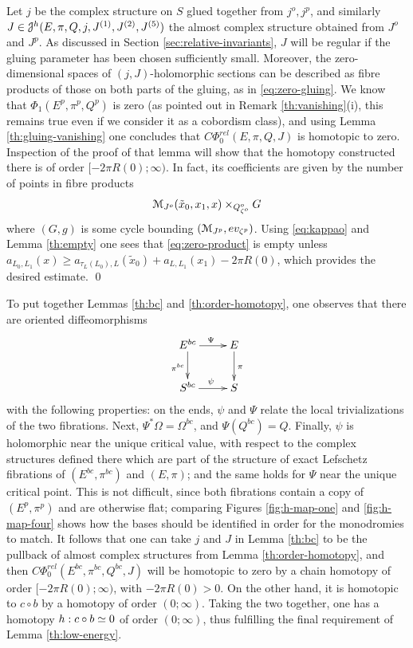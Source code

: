 \documentclass[10pt,letterpaper]{article}
\begin{document}
Let $j$ be the complex structure on $S$ glued together from $j^o,j^p$, and
similarly $J \in \mathcal{J}^h(E,\pi,Q,j,J^{(1)},J^{(2)},J^{(5)})$ the almost complex
structure obtained from $J^o$ and $J^p$. As discussed in Section
\ref{sec:relative-invariants}, $J$ will be regular if the gluing parameter has
been chosen sufficiently small. Moreover, the zero-dimensional spaces of
$(j,J)$-holomorphic sections can be described as fibre products of those on
both parts of the gluing, as in \eqref{eq:zero-gluing}. We know that
$\Phi_1(E^p,\pi^p,Q^p)$ is zero (as pointed out in Remark
\ref{th:vanishing}(i), this remains true even if we consider it as a cobordism
class), and using Lemma \ref{th:gluing-vanishing} one concludes that
$C\Phi_0^{rel}(E,\pi,Q,J)$ is homotopic to zero. Inspection of the proof of
that lemma will show that the homotopy constructed there is of order $[-2\pi
R(0);\infty)$. In fact, its coefficients are given by the number of points in
fibre products
\begin{equation} \label{eq:zero-product}
\mathcal{M}_{J^o}(\tilde{x}_0,x_1,x) \times_{Q^o_{\zeta^o}} G
\end{equation}
where $(G,g)$ is some cycle bounding $(\mathcal{M}_{J^p},ev_{\zeta^p})$. Using
\eqref{eq:kappao} and Lemma \ref{th:empty} one sees that
\eqref{eq:zero-product} is empty unless $a_{L_0,L_1}(x) \geq
a_{\tau_L(L_0),L}(\tilde{x}_0) + a_{L,L_1}(x_1) - 2\pi R(0)$, which provides
the desired estimate. \qed

To put together Lemmas \ref{th:bc} and \ref{th:order-homotopy}, one observes
that there are oriented diffeomorphisms
\[
\xymatrix{
 {E^{bc}} \ar[r]^{\Psi} \ar[d]_{\pi^{bc}} & {E} \ar[d]^{\pi} \\
 {S^{bc}} \ar[r]^{\psi} & {S}
}
\]
with the following properties: on the ends, $\psi$ and $\Psi$ relate the local
trivializations of the two fibrations. Next, $\Psi^*\Omega = \Omega^{bc}$, and
$\Psi(Q^{bc}) = Q$. Finally, $\psi$ is holomorphic near the unique critical
value, with respect to the complex structures defined there which are part of
the structure of exact Lefschetz fibrations of $(E^{bc},\pi^{bc})$ and
$(E,\pi)$; and the same holds for $\Psi$ near the unique critical point. This
is not difficult, since both fibrations contain a copy of $(E^p,\pi^p)$ and are
otherwise flat; comparing Figures \ref{fig:h-map-one} and \ref{fig:h-map-four}
shows how the bases should be identified in order for the monodromies to match.
It follows that one can take $j$ and $J$ in Lemma \ref{th:bc} to be the
pullback of almost complex structures from Lemma \ref{th:order-homotopy}, and
then $C\Phi_0^{rel}(E^{bc},\pi^{bc},Q^{bc},J)$ will be homotopic to zero by a
chain homotopy of order $[-2\pi R(0);\infty)$, with $-2\pi R(0) > 0$. On the
other hand, it is homotopic to $c \circ b$ by a homotopy of order $(0;\infty)$.
Taking the two together, one has a homotopy $h: c \circ b \simeq 0$ of order
$(0;\infty)$, thus fulfilling the final requirement of Lemma
\ref{th:low-energy}.
\end{document}

